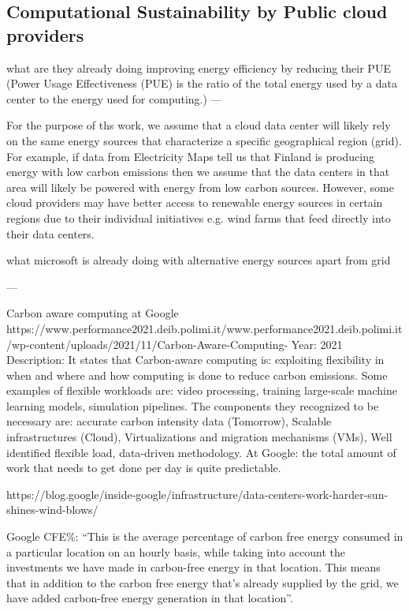 
\subsection{Computational Sustainability by Public cloud providers}

what are they already doing
improving energy efficiency by reducing their PUE
(Power Usage Effectiveness (PUE) is the ratio of the total energy used by a data center to the energy used for computing.)
---

For the purpose of ths work, we assume that a cloud data center will likely rely on the same energy sources that characterize a specific geographical region (grid).
For example, if data from Electricity Maps tell us that Finland is producing energy with low carbon emissions then we assume that the data centers in that area will likely be powered with energy from low carbon sources.
However, some cloud providers may have better access to renewable energy sources in certain regions due to their individual initiatives e.g. wind farms that feed directly into their data centers.


what microsoft is already doing with alternative energy sources apart from grid


---

Carbon aware computing at Google
https://www.performance2021.deib.polimi.it/www.performance2021.deib.polimi.it/wp-content/uploads/2021/11/Carbon-Aware-Computing-%
Year: 2021
Description: 
It states that Carbon-aware computing is: exploiting flexibility in when and where and how computing is done to reduce carbon emissions.
Some examples of flexible workloads are: video processing, training large-scale machine learning models, simulation pipelines.
The components they recognized to be necessary are: accurate carbon intensity data (Tomorrow), Scalable infrastructures (Cloud), Virtualizations and migration mechanisms (VMs), Well identified flexible load, data-driven methodology.
At Google: the total amount of work that needs to get done per day is quite predictable.

https://blog.google/inside-google/infrastructure/data-centers-work-harder-sun-shines-wind-blows/

Google CFE\%: “This is the average percentage of carbon free energy consumed in a particular location on an hourly basis, while taking into account the investments we have made in carbon-free energy in that location. This means that in addition to the carbon free energy that's already supplied by the grid, we have added carbon-free energy generation in that location”.

